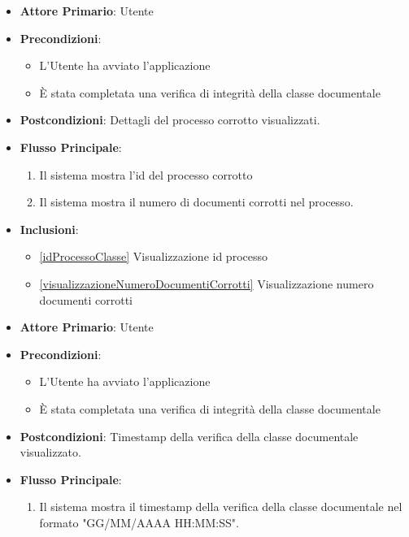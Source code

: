 \begin{itemize}
    \item \textbf{Attore Primario}: Utente
    \item \textbf{Precondizioni}: 
        \begin{itemize}
            \item L'Utente ha avviato l'applicazione
            \item È stata completata una verifica di integrità della classe documentale
        \end{itemize}
    \item \textbf{Postcondizioni}: Dettagli del processo corrotto visualizzati.
    \item \textbf{Flusso Principale}:
        \begin{enumerate}
            \item Il sistema mostra l'id del processo corrotto
            \item Il sistema mostra il numero di documenti corrotti nel processo.
        \end{enumerate}
    \item \textbf{Inclusioni}: \begin{itemize}
        \item \ref{idProcessoClasse} Visualizzazione id processo
        \item \ref{visualizzazioneNumeroDocumentiCorrotti} Visualizzazione numero documenti corrotti
        \end{itemize}
\end{itemize}

\begin{itemize}
    \item \textbf{Attore Primario}: Utente
    \item \textbf{Precondizioni}: 
        \begin{itemize}
            \item L'Utente ha avviato l'applicazione
            \item È stata completata una verifica di integrità della classe documentale
        \end{itemize}  
    \item \textbf{Postcondizioni}: Timestamp della verifica della classe documentale visualizzato.
    \item \textbf{Flusso Principale}:
        \begin{enumerate}
            \item Il sistema mostra il timestamp della verifica della classe documentale nel formato "GG/MM/AAAA HH:MM:SS".
        \end{enumerate}
\end{itemize}


